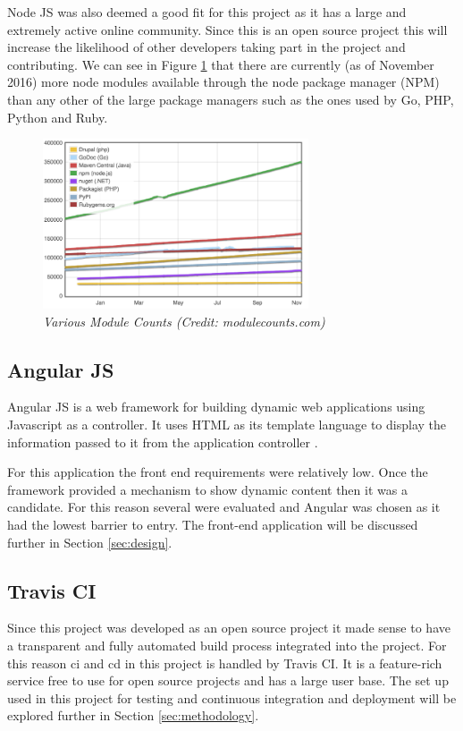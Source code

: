 Node JS was also deemed a good fit for this project as it has a large and extremely active online community. Since this is an open source project this will increase the likelihood of other developers taking part in the project and contributing. We can see in Figure \ref{fig:counts} that there are currently (as of November 2016) more node modules available through the node package manager (NPM) than any other of the large package managers such as the ones used by Go, PHP, Python and Ruby. 

\begin{figure}[!ht]
\centering
\includegraphics*[width=0.7\textwidth]{images/module_counts}
\caption{\em Various Module Counts (Credit: modulecounts.com)}
\label{fig:counts}
\end{figure}

\subsection{Angular JS}
Angular JS is a web framework for building dynamic web applications using Javascript as a controller. It uses HTML as its template language to display the information passed to it from the application controller \citep{Angular2017}. 

For this application the front end requirements were relatively low. Once the framework provided a mechanism to show dynamic content then it was a candidate. For this reason several were evaluated and Angular was chosen as it had the lowest barrier to entry. The front-end application will be discussed further in Section \ref{sec:design}.

\subsection{Travis CI}
Since this project was developed as an open source project it made sense to have a transparent and fully automated build process integrated into the project. For this reason \gls{ci} and \gls{cd} in this project is handled by \gls{Travis} CI. It is a feature-rich service free to use for open source projects and has a large user base. The set up used in this project for testing and continuous integration and deployment will be explored further in Section \ref{sec:methodology}.

